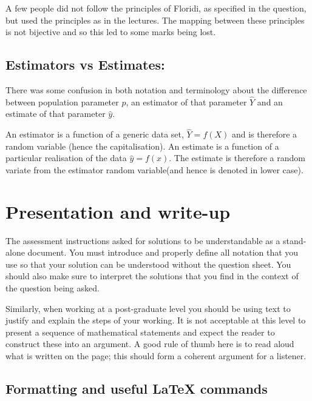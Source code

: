 \documentclass[a4paper, 11pt]{article}
\begin{document}
A few people did not follow the principles of Floridi, as specified in the question, but used the principles as in the lectures. The mapping between these principles is not bijective and so this led to some marks being lost. 

\subsection{Estimators vs Estimates:}
There was some confusion in both notation and terminology about the difference between population parameter $p$, an estimator of that parameter $\hat Y$ and an estimate of that parameter $\hat y$.

An estimator is a function of a generic data set, $\hat Y = f(X)$ and is therefore a random variable (hence the capitalisation). An estimate is a function of a particular realisation of the data $\hat y = f(x)$. The estimate is therefore a random variate from the estimator random variable(and hence is denoted in lower case).

\section{Presentation and write-up}

The assessment instructions asked for solutions to be understandable as a stand-alone document. You must introduce and properly define all notation that you use so that your solution can be understood without the question sheet. You should also make sure to interpret the solutions that you find in the context of the question being asked. 

Similarly, when working at a post-graduate level you should be using text to justify and explain the steps of your working. It is not acceptable at this level to present a sequence of mathematical statements and expect the reader to construct these into an argument. A good rule of thumb here is to read aloud what is written on the page; 
this should form a coherent argument for a listener. 


\subsection{Formatting and useful LaTeX commands}
\end{document}
